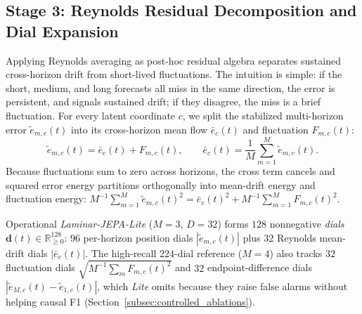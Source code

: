 \subsection{Stage 3: Reynolds Residual Decomposition and Dial Expansion}
\label{subsec:reynolds_expansion}
Applying Reynolds averaging \cite{reynolds1895dynamical} as post-hoc residual algebra separates sustained cross-horizon drift from short-lived fluctuations. The intuition is simple: if the short, medium, and long forecasts all miss in the same direction, the error is persistent, and signals sustained drift; if they disagree, the miss is a brief fluctuation. For every latent coordinate $c$, we split the stabilized multi-horizon error $\tilde{e}_{m,c}(t)$ into its cross-horizon mean flow $\bar{e}_c(t)$ and fluctuation $F_{m,c}(t)$:
\begin{equation}
    \tilde{e}_{m,c}(t) = \bar{e}_c(t) + F_{m,c}(t), \qquad \bar{e}_c(t) = \frac{1}{M}\sum_{m=1}^M \tilde{e}_{m,c}(t).
\end{equation}
Because fluctuations sum to zero across horizons, the cross term cancels and squared error energy partitions orthogonally into mean-drift energy and fluctuation energy: $M^{-1}\sum_{m=1}^M \tilde{e}_{m,c}(t)^2 = \bar{e}_c(t)^2 + M^{-1}\sum_{m=1}^M F_{m,c}(t)^2$.

Operational \emph{Laminar-JEPA-Lite} ($M=3$, $D=32$) forms $128$ nonnegative \emph{dials} $\mathbf{d}(t) \in \mathbb{R}_{\ge 0}^{128}$: $96$ per-horizon position dials $|\tilde{e}_{m,c}(t)|$ plus $32$ Reynolds mean-drift dials $|\bar{e}_c(t)|$. The high-recall $224$-dial reference ($M=4$) also tracks $32$ fluctuation dials $\sqrt{M^{-1}\sum_m F_{m,c}(t)^2}$ and $32$ endpoint-difference dials $|\tilde{e}_{M,c}(t)-\tilde{e}_{1,c}(t)|$, which \emph{Lite} omits because they raise false alarms without helping causal F1 (Section~\ref{subsec:controlled_ablations}).

